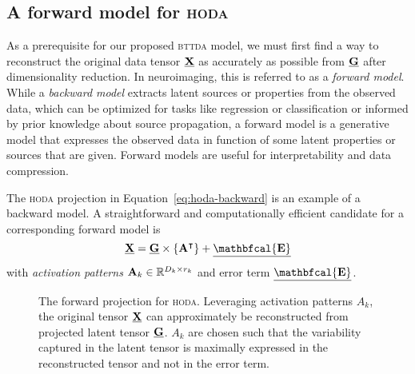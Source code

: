 \documentclass[twocolumn]{article}
\begin{document}
\subsection{A forward model for \textsc{hoda}}
As a prerequisite for our proposed \textsc{bttda} model, we must first find a
way to reconstruct the original data tensor $\underline{\mathbf{X}}$ as accurately as possible
from $\underline{\mathbf{G}}$ after dimensionality reduction.
In neuroimaging, this is referred to as a \emph{forward model}.
While a \emph{backward model} extracts latent sources or properties from the observed
data, which can be optimized for tasks like regression or classification or
informed by prior knowledge about source propagation, a forward model is a
generative model that expresses the observed data in function of some latent
properties or sources that are given. Forward models are useful for
interpretability and data compression.

The \textsc{hoda} projection in Equation~\ref{eq:hoda-backward} is an example
of a backward model.
A straightforward and computationally efficient candidate for a corresponding
forward model is
\begin{equation}
	\ten{X} = \ten{G}\mmpr{\mat{A}^\intercal} + \ten{\mathbfcal{E}}
	\label{eq:hoda-forward}
\end{equation}
with \emph{activation patterns} $\mathbf{A}_k \in \mathbb{R}^{D_k\times r_k}$
and error term $\ten{\mathbfcal{E}}$.
\begin{figure}
	\centering
	
	\caption{The forward projection for \textsc{hoda}. Leveraging activation
		patterns $A_k$, the original tensor $\underline{\mathbf{X}}$ can approximately be
		reconstructed from projected latent tensor $\underline{\mathbf{G}}$. $A_k$ are chosen such
		that the variability captured in the latent tensor is maximally expressed in
		the reconstructed tensor and not in the error term.}
	\label{fig:hoda-forward}
\end{figure}
\end{document}

